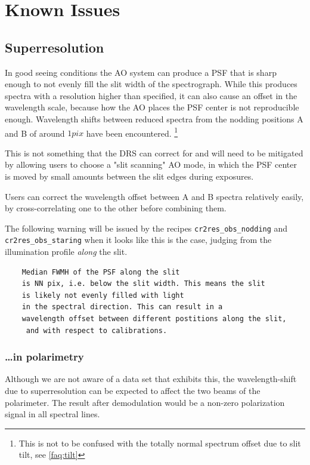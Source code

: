 \section{Known Issues}
\label{sec:knownissues}

\subsection{Superresolution}
\label{sec:superres}

In good seeing conditions the AO system can produce a PSF that is sharp enough
to not evenly fill the slit width of the spectrograph. While this produces
spectra with a resolution higher than specified, it can also cause an offset in
the wavelength scale, because how the AO places the PSF center is not
reproducible enough. Wavelength shifts between reduced spectra from the nodding
positions A and B of around $1 pix$ have been encountered.
\footnote{This is not to be confused with the totally normal spectrum offset
due to slit tilt, see \ref{faq:tilt}}

This is not something that the DRS can correct for and will need to be mitigated
by allowing users to choose a "slit scanning" AO mode, in which the PSF center
is moved by small amounts between the slit edges during exposures.

Users can correct the wavelength offset between A and B spectra relatively
easily, by cross-correlating one to the other before combining them.

The following warning will be issued by the recipes \verb!cr2res_obs_nodding!
and \verb!cr2res_obs_staring! when it looks like this is the case, judging from
the illumination profile \emph{along} the slit. 
\begin{verbatim}
    Median FWMH of the PSF along the slit 
    is NN pix, i.e. below the slit width. This means the slit 
    is likely not evenly filled with light 
    in the spectral direction. This can result in a 
    wavelength offset between different postitions along the slit,
     and with respect to calibrations.
\end{verbatim}

\subsubsection{\ldots in polarimetry}

Although we are not aware of a data set that exhibits this, the wavelength-shift
due to superresolution can be expected to affect the two beams of the
polarimeter. The result after demodulation would be a non-zero polarization
signal in all spectral lines.


